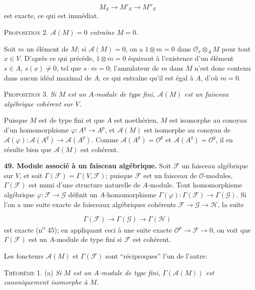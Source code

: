 \begin{equation*}
M_S \to M'_S \to M''_S
\end{equation*}
est exacte, ce qui est immédiat.

\textsc{Proposition} 2. \textit{$\mathcal{A}(M) = 0$ entraîne $M = 0$.}

Soit $m$ un élément de $M$; si $\mathcal{A}(M) = 0$, on a $1 \otimes m = 0$ dans $\mathcal{O}_x \otimes_A M$ pour tout $x \in V$. D'après ce qui précède, $1 \otimes m = 0$ équivaut à l'existence d'un élément $s \in A$, $s(x) \neq 0$, tel que $s \cdot m = 0$; l'annulateur de $m$ dans $M$ n'est donc contenu dans aucun idéal maximal de $A$, ce qui entraîne qu'il est égal à $A$, d'où $m = 0$.

\textsc{Proposition} 3. \textit{Si $M$ est un $A$-module de type fini, $\mathcal{A}(M)$ est un faisceau algébrique cohérent sur $V$.}

Puisque $M$ est de type fini et que $A$ est noethérien, $M$ est isomorphe au conoyau d'un homomorphisme $\varphi : A^q \to A^p$, et $\mathcal{A}(M)$ est isomorphe au conoyau de $\mathcal{A}(\varphi) : \mathcal{A}(A^q) \to \mathcal{A}(A^p)$. Comme $\mathcal{A}(A^p) = \mathcal{O}^p$ et $\mathcal{A}(A^q) = \mathcal{O}^q$, il en résulte bien que $\mathcal{A}(M)$ est cohérent.

\textbf{49. Module associé à un faisceau algébrique.} Soit $\mathcal{F}$ un faisceau algébrique sur $V$, et soit $\Gamma(\mathcal{F}) = \Gamma(V, \mathcal{F})$; puisque $\mathcal{F}$ est un faisceau de $\mathcal{O}$-modules, $\Gamma(\mathcal{F})$ est muni d'une structure naturelle de $A$-module. Tout homomorphisme algébrique $\varphi : \mathcal{F} \to \mathcal{G}$ définit un $A$-homomorphisme $\Gamma(\varphi) : \Gamma(\mathcal{F}) \to \Gamma(\mathcal{G})$. Si l'on a une suite exacte de faisceaux algébriques cohérents $\mathcal{F} \to \mathcal{G} \to \mathcal{H}$, la suite

\begin{equation*}
\Gamma(\mathcal{F}) \to \Gamma(\mathcal{G}) \to \Gamma(\mathcal{H})
\end{equation*}
est exacte (n\textsuperscript{o} 45); en appliquant ceci à une suite exacte $\mathcal{O}^p \to \mathcal{F} \to 0$, on voit que $\Gamma(\mathcal{F})$ est un $A$-module de type fini si $\mathcal{F}$ est cohérent.

Les foncteurs $\mathcal{A}(M)$ et $\Gamma(\mathcal{F})$ sont ``réciproques'' l'un de l'autre:

\textsc{Théorème} 1. (a) \textit{Si $M$ est un $A$-module de type fini, $\Gamma(\mathcal{A}(M))$ est canoniquement isomorphe à $M$.}

